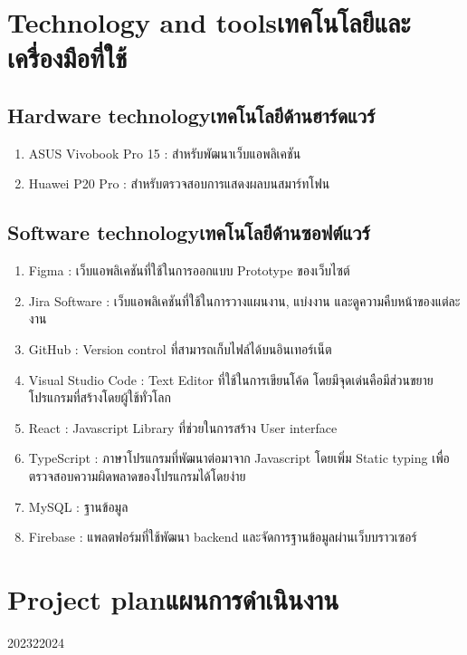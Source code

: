\section{\ifenglish Technology and tools\else เทคโนโลยีและเครื่องมือที่ใช้\fi}

\subsection{\ifenglish Hardware technology\else เทคโนโลยีด้านฮาร์ดแวร์\fi}
\begin{enumerate}
    \item ASUS Vivobook Pro 15 : สำหรับพัฒนาเว็บแอพลิเคชัน
    \item Huawei P20 Pro : สำหรับตรวจสอบการแสดงผลบนสมาร์ทโฟน
\end{enumerate}
\subsection{\ifenglish Software technology\else เทคโนโลยีด้านซอฟต์แวร์\fi}
\begin{enumerate}
    \item Figma : เว็บแอพลิเคชันที่ใช้ในการออกแบบ Prototype ของเว็บไซต์
    \item Jira Software : เว็บแอพลิเคชันที่ใช้ในการวางแผนงาน, แบ่งงาน และดูความคืบหน้าของแต่ละงาน
    \item GitHub : Version control ที่สามารถเก็บไฟล์ได้บนอินเทอร์เน็ต
    \item Visual Studio Code : Text Editor ที่ใช้ในการเขียนโค้ด โดยมีจุดเด่นคือมีส่วนขยายโปรแกรมที่สร้างโดยผู้ใช้ทั่วโลก
    \item React : Javascript Library ที่ช่วยในการสร้าง User interface
    \item TypeScript : ภาษาโปรแกรมที่พัฒนาต่อมาจาก Javascript โดยเพิ่ม Static typing เพื่อตรวจสอบความผิดพลาดของโปรแกรมได้โดยง่าย
    \item MySQL : ฐานข้อมูล
    \item Firebase : แพลตฟอร์มที่ใช้พัฒนา backend และจัดการฐานข้อมูลผ่านเว็บบราวเซอร์
\end{enumerate}
\section{\ifenglish Project plan\else แผนการดำเนินงาน\fi}

\begin{plan}{6}{2023}{2}{2024}
\end{plan}

